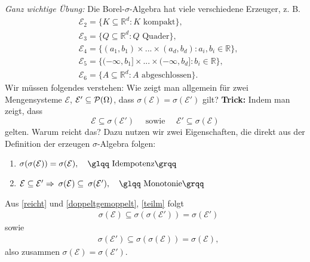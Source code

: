 	\textit{Ganz wichtige Übung:} Die Borel-$\sigma$-Algebra hat viele verschiedene Erzeuger, z. B. 
	\begin{align*}
		&\mathcal E_2 = \{ K \subseteq \mathbb{R}^d \! : \text{$K$ kompakt} \},\\		
		&\mathcal E_3 = \{ Q \subseteq \mathbb{R}^d \! : \text{$Q$ Quader} \},\\
		&\mathcal E_4 = \{ (a_1,b_1)\times...\times(a_d,b_d) \! : a_i, b_i \in \mathbb{R} \},\\
		&\mathcal E_5 = \{ (-\infty,b_1]\times...\times(-\infty,b_d] \! : b_i \in \mathbb{R} \},\\
		&\mathcal E_6 = \{ A \subseteq \mathbb{R}^d \! : \text{$A$ abgeschlossen} \}.
	\end{align*}
	Wir m\"ussen folgendes verstehen: Wie zeigt man allgemein für zwei Mengensysteme $\mathcal E$, $\mathcal E' \subseteq \mathcal{P}(\Omega)$, dass $\sigma(\mathcal E) = \sigma(\mathcal E')$ gilt? \textbf{Trick:} Indem man zeigt, dass \begin{equation} \label{reicht}
		\mathcal E \subseteq \sigma(\mathcal E') \quad \text{ sowie } \quad  \mathcal E' \subseteq \sigma(\mathcal E)
	\end{equation} 
	gelten. Warum reicht das? Dazu nutzen wir zwei Eigenschaften, die direkt aus der Definition der erzeugen $\sigma$-Algebra folgen:
	\begin{enumerate}[label=(\roman*)]
		\item \label{doppeltgemoppelt} $\sigma(\sigma(\mathcal E)) = \sigma(\mathcal E),\quad \text{\glqq Idempotenz\grqq}$
		\item \label{teilm} $\cE \subseteq \cE' \Rightarrow \: \sigma(\cE) \subseteq \:  \sigma(\cE'),\quad \text{\glqq Monotonie\grqq}$
	\end{enumerate}
	Aus \eqref{reicht} und \ref{doppeltgemoppelt}, \ref{teilm} folgt \begin{align*}
		&\sigma(\mathcal E) \subseteq \sigma(\sigma(\mathcal E')) = \sigma(\mathcal E')
		\end{align*}
		sowie
		\begin{align*}
		&\sigma(\mathcal E') \subseteq \sigma(\sigma(\mathcal E)) = \sigma(\mathcal E),
	\end{align*}
	also zusammen $\sigma(\mathcal E) = \sigma(\mathcal E')$. \smallskip	
	
